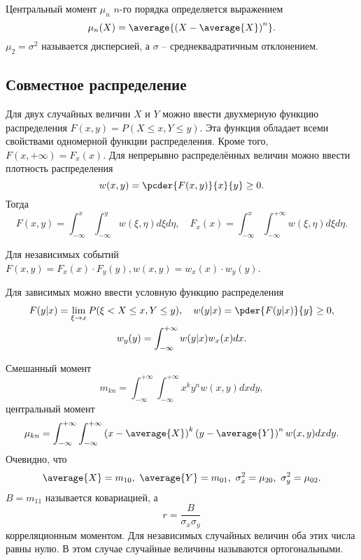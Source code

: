 Центральный момент \( \mu_n \) \( n \)-го порядка определяется выражением
\[
    \mu_n(X) = \average{\left(X - \average{X}\right)^n}.
\]
\( \mu_2 = \sigma^2 \) называется дисперсией, а \( \sigma \) --
среднеквадратичным отклонением.

\subsection{Совместное распределение}
Для двух случайных величин \( X \) и \( Y \) можно ввести двухмерную функцию
распределения \( F(x,y) = P(X \le x, Y \le y) \). Эта функция обладает всеми
свойствами одномерной функции распределения. Кроме того,
\( F(x, +\infty) = F_x(x) \). Для непрерывно распределённых величин можно ввести
плотность распределения
\[
    w(x,y) = \pcder{F(x,y)}{x}{y} \ge 0.
\]
Тогда
\[
    F(x, y) = \int_{-\infty}^x\int_{-\infty}^y w(\xi,\eta)d\xi d\eta,\quad
    F_x(x) = \int_{-\infty}^x\int_{-\infty}^{+\infty} w(\xi,\eta)d\xi d\eta.
\]

Для независимых событий
\( F(x,y) = F_x(x) \cdot F_y(y), w(x,y) = w_x(x) \cdot w_y(y) \).

Для зависимых можно ввести условную функцию распределения
\begin{gather*}
    F(y|x) = \lim_{\xi \to x} P(\xi < X \le x, Y \le y),\quad
    w(y|x) = \pder{F(y|x)}{y} \ge 0,\\
    w_y(y) = \int_{-\infty}^{+\infty} w(y|x) w_x(x) dx.
\end{gather*}

Смешанный момент
\[
    m_{kn} = \int_{-\infty}^{+\infty}\int_{-\infty}^{+\infty}x^ky^nw(x,y)dxdy,
\]
центральный момент
\[
    \mu_{kn} = \int_{-\infty}^{+\infty}\int_{-\infty}^{+\infty}
        \left(x-\average{X}\right)^k
        \left(y-\average{Y}\right)^n w(x,y)dxdy.
\]
Очевидно, что
\[
    \average{X} = m_{10},\ \average{Y} = m_{01},\ \sigma_x^2 = \mu_{20},
    \ \sigma_y^2 = \mu_{02}.
\]
\( B = m_{11} \) называется ковариацией, а
\[
    r = \frac{B}{\sigma_x\sigma_y}
\]
корреляционным моментом. Для независимых случайных величин оба этих числа равны
нулю. В этом случае случайные величины называются ортогональными.

